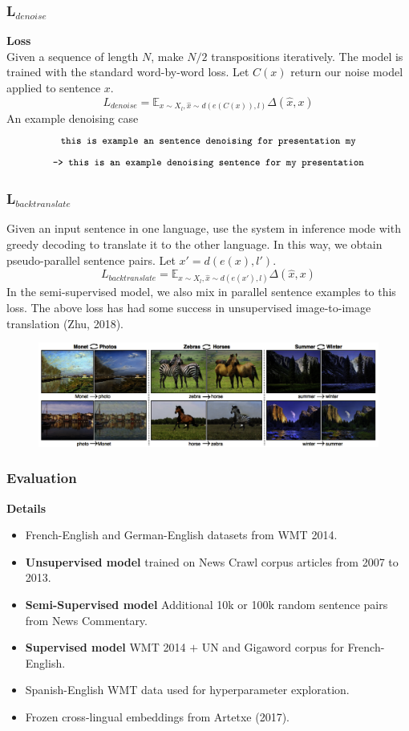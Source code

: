 \documentclass{beamer}
\begin{document}
\begin{frame}
\frametitle{L$_{denoise}$}
\textbf{Loss}\\
Given a sequence of length $N$, make $N/2$ transpositions iteratively. The model is trained with the standard word-by-word loss. Let $C(x)$ return our noise model applied to sentence $x$.
$$ L_{denoise} = \mathbb{E}_{x\sim X_l, \hat{x}\sim d(e(C(x)),l)}\Delta(\hat{x},x) $$
An example denoising case
$$\texttt{\small this is example an sentence denoising for presentation my}$$
$$\texttt{\small -> this is an example denoising sentence for my presentation}$$
\end{frame}

\begin{frame}
\frametitle{L$_{backtranslate}$}
Given an input sentence in one language, use the system in inference mode with greedy decoding to translate it to the other language. In this way, we obtain pseudo-parallel sentence pairs. Let $x'=d(e(x),l')$.
$$ L_{backtranslate} = \mathbb{E}_{x\sim X_l, \hat{x}\sim d(e(x'),l)}\Delta(\hat{x},x) $$
In the semi-supervised model, we also mix in parallel sentence examples to this loss. The above loss has had some success in unsupervised image-to-image translation (Zhu, 2018).\\ \pause
\begin{figure}
  \centering
  \includegraphics[width=\textwidth]{pres_imgs/imagetran}
\end{figure}
\end{frame}

\begin{frame}
\frametitle{Evaluation}
\textbf{Details}
\begin{itemize}
\item French-English and German-English datasets from WMT 2014.\pause
\item \textbf{Unsupervised model} trained on News Crawl corpus articles from 2007 to 2013.\pause
\item \textbf{Semi-Supervised model} Additional 10k or 100k random sentence pairs from News Commentary.\pause
\item \textbf{Supervised model} WMT 2014 $+$ UN and Gigaword corpus for French-English.\pause
\item Spanish-English WMT data used for hyperparameter exploration.\pause
\item Frozen cross-lingual embeddings from Artetxe (2017).
\end{itemize}
\end{frame}
\end{document}
